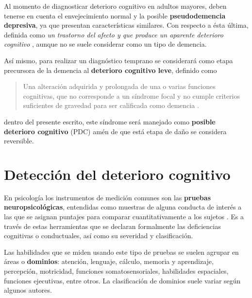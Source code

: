 Al momento de diagnosticar deterioro cognitivo en adultos mayores, deben tenerse en cuenta el 
envejecimiento normal y la posible \textbf{pseudodemencia depresiva}, ya que presentan 
características similares. 
%
Con respecto a ésta última, definida como \textit{un trastorno del afecto y que produce un aparente 
deterioro cognitivo} \cite{DCM5}, aunque no se suele considerar como un tipo de demencia.

Así mismo, para realizar un diagnóstico temprano se considerará como etapa precursora de la 
demencia al \textbf{deterioro cognitivo leve}, definido como 
\begin{quote}
Una alteración adquirida y prolongada de una o varias funciones cognitivas, que no corresponde a un 
síndrome focal y no cumple criterios suficientes de gravedad para ser calificada como demencia
\cite{Robles02}.
\end{quote}
dentro del presente escrito, este síndrome será manejado como \textbf{posible deterioro cognitivo} 
(PDC) amén de que está etapa de daño se considera reversible.


\section{Detección del deterioro cognitivo}

En psicología los instrumentos de medición comunes son las \textbf{pruebas neuropsicológicas}, 
entendidas como muestras de alguna conducta de interés a las que se asignan puntajes para comparar 
cuantitativamente a los sujetos \cite{Ardila12}.
%
Es a través de estas herramientas que se declaran formalmente las deficiencias cognitivas o 
conductuales, así como su severidad y clasificación.

Las habilidades que se miden usando este tipo de pruebas se suelen agrupar en áreas o 
\textbf{dominios}: atención, lenguaje, cálculo, memoria y aprendizaje, percepción, motricidad, 
funciones somatosensoriales, habilidades espaciales, funciones ejecutivas, entre otros. 
%
La clasificación de dominios suele variar según algunos autores.

